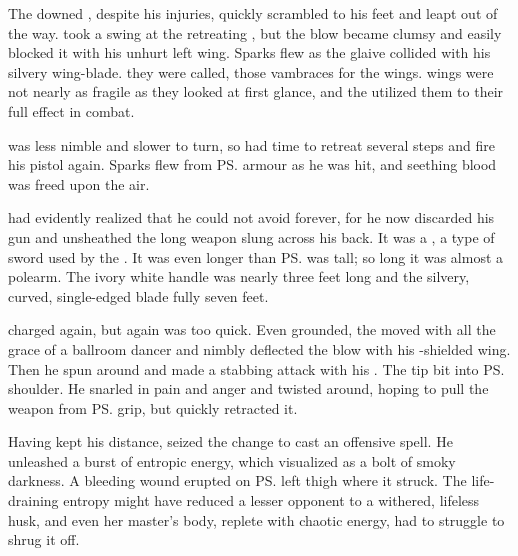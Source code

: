 The downed \Teshrial{}, despite his injuries, quickly scrambled to his feet and leapt out of the way. 
\Ishnaruchaefir{} took a swing at the retreating \resphan, but the blow became clumsy and \Teshrial{} easily blocked it with his unhurt left wing. 
Sparks flew as the glaive collided with his silvery wing-blade. 
\index{\kilghan}%
%
\emph{} they were called, those vambraces for the wings. 
\Resphan{} wings were not nearly as fragile as they looked at first glance, and the \resphain{} utilized them to their full effect in combat. 

\Ishnaruchaefir{} was less nimble and slower to turn, so \Teshrial{} had time to retreat several steps and fire his pistol again. 
Sparks flew from \ps{\Ishnaruchaefir}{} armour as he was hit, and seething blood was freed upon the air. 

\index{\senaan}%
\Teshrial{} had evidently realized that he could not avoid \melee{} forever, for he now discarded his gun and unsheathed the long weapon slung across his back. 
It was a \senaan, a type of sword used by the \CiriathSepher. 
It was even longer than \ps{\Teshrial} was tall; so long it was almost a polearm. 
The ivory white handle was nearly three feet long and the silvery, curved, single-edged blade fully seven feet. 


\Ishnaruchaefir{} charged again, but again \Teshrial{} was too quick. 
Even grounded, the \resphan{} moved with all the grace of a ballroom dancer and nimbly deflected the blow with his \kilghan-shielded wing. 
Then he spun around and made a stabbing attack with his \senaan. 
The tip bit into \ps{\Ishnaruchaefir} shoulder. 
He snarled in pain and anger and twisted around, hoping to pull the weapon from \ps{\Teshrial} grip, but \Teshrial{} quickly retracted it. 


Having kept his distance, \Teshrial{} seized the change to cast an offensive spell. 
He unleashed a burst of entropic energy, which \Criseis{} visualized as a bolt of smoky darkness. 
A bleeding wound erupted on \ps{\Ishnaruchaefir} left thigh where it struck. 
The life-draining entropy might have reduced a lesser opponent to a withered, lifeless husk, and even her master's body, replete with chaotic \xsic{} energy, had to struggle to shrug it off. 

